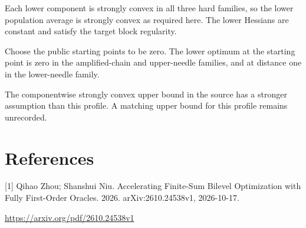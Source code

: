 \documentclass[10pt,a4paper]{article}
\begin{document}
Each lower component is strongly convex in all three hard families, so the lower population average is strongly convex as required here. The lower Hessians are constant and satisfy the target block regularity.

Choose the public starting points to be zero. The lower optimum at the starting point is zero in the amplified-chain and upper-needle families, and at distance one in the lower-needle family.

The componentwise strongly convex upper bound in the source has a stronger assumption than this profile. A matching upper bound for this profile remains unrecorded.

\section{References}
[1] Qihao Zhou; Shanshui Niu. Accelerating Finite-Sum Bilevel Optimization with Fully First-Order Oracles. 2026. arXiv:2610.24538v1, 2026-10-17.

\url{https://arxiv.org/pdf/2610.24538v1}
\end{document}
